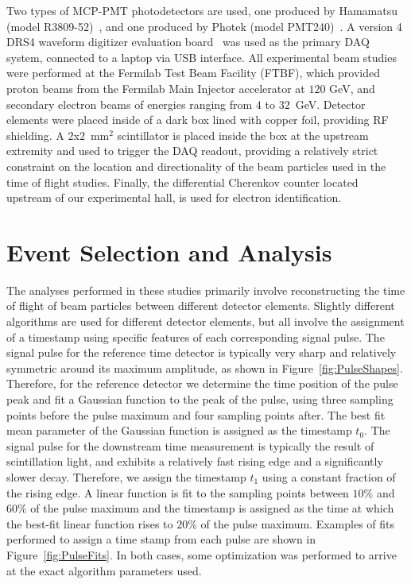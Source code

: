 \documentclass[12pt]{article}
\begin{document}
Two types of MCP-PMT photodetectors 
are used, one produced by Hamamatsu 
(model R3809-52)~\cite{HamamatsuMCP3809}, and one
produced by Photek (model PMT240)~\cite{Photek240}. 
A version 4 DRS4 waveform digitizer evaluation board~\cite{DRS4} was
used as the primary DAQ system, connected to a laptop via
USB interface. All experimental beam studies were performed
at the Fermilab Test Beam Facility (FTBF), which 
provided proton beams from the Fermilab Main Injector accelerator
at $120$ GeV, and secondary electron beams of energies ranging 
from $4$ to $32$~GeV. Detector elements were placed inside of a 
dark box lined with copper foil, providing RF shielding. A
$2$x$2$~$\mathrm{mm}^{2}$ scintillator is placed inside the box at
the upstream extremity and used to trigger the DAQ readout,
providing a relatively strict constraint on the location and directionality
of the beam particles used in the time of flight studies. 
Finally, the differential Cherenkov counter located upstream
of our experimental hall, is used for electron identification. 

\section{Event Selection and Analysis}

The analyses performed in these studies primarily involve
reconstructing the time of flight of beam particles
between different detector elements. Slightly different
algorithms are used for different detector elements,
but all involve the assignment of a timestamp using 
specific features of each corresponding signal pulse.
The signal pulse for the reference time detector
is typically very sharp and relatively symmetric 
around its maximum amplitude, as shown in 
Figure~\ref{fig:PulseShapes}. Therefore, for the reference 
detector we determine the time position of the pulse
peak and fit a Gaussian function to the peak
of the pulse, using three sampling points before the 
pulse maximum and four sampling points after. The
best fit mean parameter of the Gaussian function is
assigned as the timestamp $t_{0}$. The signal pulse
for the downstream time measurement is typically
the result of scintillation light, and exhibits a 
relatively fast rising edge and a significantly slower
decay. Therefore, we assign the timestamp $t_{1}$ 
using a constant fraction of the rising edge.
A linear function is fit to the sampling
points between $10\%$ and $60\%$ of the pulse maximum
and the timestamp is assigned as the time 
at which the best-fit linear function rises to $20\%$ of 
the pulse maximum. Examples of fits 
performed to assign a time stamp from each pulse are 
shown in Figure~\ref{fig:PulseFits}. In both cases, some 
optimization was performed to arrive at the exact algorithm 
parameters used.
\end{document}
